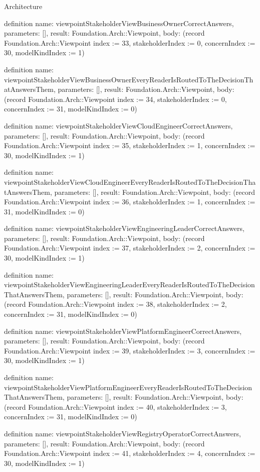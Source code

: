 \begin{lexlean}{Architecture}
\begin{semanticmodule}
definition{
  name: viewpointStakeholderViewBusinessOwnerCorrectAnswers,
  parameters: [],
  result: Foundation.Arch::Viewpoint,
  body: (record Foundation.Arch::Viewpoint {index := 33, stakeholderIndex := 0, concernIndex := 30, modelKindIndex := 1})
}

definition{
  name: viewpointStakeholderViewBusinessOwnerEveryReaderIsRoutedToTheDecisionThatAnswersThem,
  parameters: [],
  result: Foundation.Arch::Viewpoint,
  body: (record Foundation.Arch::Viewpoint {index := 34, stakeholderIndex := 0, concernIndex := 31, modelKindIndex := 0})
}

definition{
  name: viewpointStakeholderViewCloudEngineerCorrectAnswers,
  parameters: [],
  result: Foundation.Arch::Viewpoint,
  body: (record Foundation.Arch::Viewpoint {index := 35, stakeholderIndex := 1, concernIndex := 30, modelKindIndex := 1})
}

definition{
  name: viewpointStakeholderViewCloudEngineerEveryReaderIsRoutedToTheDecisionThatAnswersThem,
  parameters: [],
  result: Foundation.Arch::Viewpoint,
  body: (record Foundation.Arch::Viewpoint {index := 36, stakeholderIndex := 1, concernIndex := 31, modelKindIndex := 0})
}

definition{
  name: viewpointStakeholderViewEngineeringLeaderCorrectAnswers,
  parameters: [],
  result: Foundation.Arch::Viewpoint,
  body: (record Foundation.Arch::Viewpoint {index := 37, stakeholderIndex := 2, concernIndex := 30, modelKindIndex := 1})
}

definition{
  name: viewpointStakeholderViewEngineeringLeaderEveryReaderIsRoutedToTheDecisionThatAnswersThem,
  parameters: [],
  result: Foundation.Arch::Viewpoint,
  body: (record Foundation.Arch::Viewpoint {index := 38, stakeholderIndex := 2, concernIndex := 31, modelKindIndex := 0})
}

definition{
  name: viewpointStakeholderViewPlatformEngineerCorrectAnswers,
  parameters: [],
  result: Foundation.Arch::Viewpoint,
  body: (record Foundation.Arch::Viewpoint {index := 39, stakeholderIndex := 3, concernIndex := 30, modelKindIndex := 1})
}

definition{
  name: viewpointStakeholderViewPlatformEngineerEveryReaderIsRoutedToTheDecisionThatAnswersThem,
  parameters: [],
  result: Foundation.Arch::Viewpoint,
  body: (record Foundation.Arch::Viewpoint {index := 40, stakeholderIndex := 3, concernIndex := 31, modelKindIndex := 0})
}

definition{
  name: viewpointStakeholderViewRegistryOperatorCorrectAnswers,
  parameters: [],
  result: Foundation.Arch::Viewpoint,
  body: (record Foundation.Arch::Viewpoint {index := 41, stakeholderIndex := 4, concernIndex := 30, modelKindIndex := 1})
}


\end{semanticmodule}
\end{lexlean}
